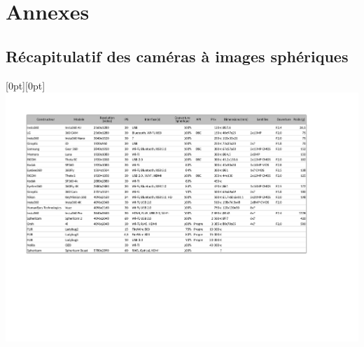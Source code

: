 \appendix
\chapter*{Annexes}
\newpage
\thispagestyle{empty}
\section*{Récapitulatif des caméras à images sphériques}

	\raisebox{-200mm}[0pt][0pt]
	{
		\hspace*{-1cm}
		\includegraphics[angle=90,origin=c,scale=0.95]{premade/cameras_360.pdf}
	}
